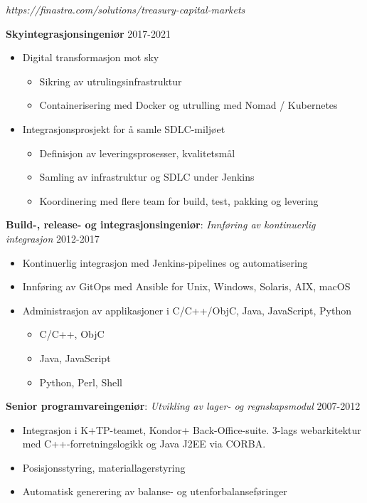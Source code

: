 \documentclass[11pt,a4paper]{moderncv}
\begin{document}
{
\textit{https://finastra.com/solutions/treasury-capital-markets}
\bigskip

\textbf{Skyintegrasjonsingeniør} \hfill 2017-2021
\bigskip
	\begin{itemize}%
		\item Digital transformasjon mot sky
			\begin{itemize}%
				\item Sikring av utrulingsinfrastruktur
				\item Containerisering med Docker og utrulling med Nomad / Kubernetes
			\end{itemize}
	\end{itemize}
\bigskip
	\begin{itemize}%
	\item	Integrasjonsprosjekt for å samle SDLC-miljøet
		\begin{itemize}%
				\item Definisjon av leveringsprosesser, kvalitetsmål
				\item Samling av infrastruktur og SDLC under Jenkins
				\item Koordinering med flere team for build, test, pakking og levering
		\end{itemize}
	\end{itemize}
\bigskip
 \textbf{Build-, release- og integrasjonsingeniør}: \textit{Innføring av kontinuerlig integrasjon} \hfill 2012-2017
\bigskip
			\begin{itemize}%
				\item Kontinuerlig integrasjon med Jenkins-pipelines og automatisering
                \item Innføring av GitOps med Ansible for Unix, Windows, Solaris, AIX, macOS
				\item Administrasjon av applikasjoner i C/C++/ObjC, Java, JavaScript, Python
					\begin{itemize}
						\item C/C++, ObjC
						\item Java, JavaScript
						\item Python, Perl, Shell
					\end{itemize}
				\end{itemize}
\bigskip
\textbf{Senior programvareingeniør}: \textit{Utvikling av lager- og regnskapsmodul} \hfill 2007-2012

\bigskip
			\begin{itemize}
				\item Integrasjon i K+TP-teamet, Kondor+ Back-Office-suite. 3-lags webarkitektur med C++-forretningslogikk og Java J2EE via CORBA.
				\item Posisjonsstyring, materiallagerstyring
				\item Automatisk generering av balanse- og utenforbalanseføringer
			\end{itemize}
}
\end{document}
